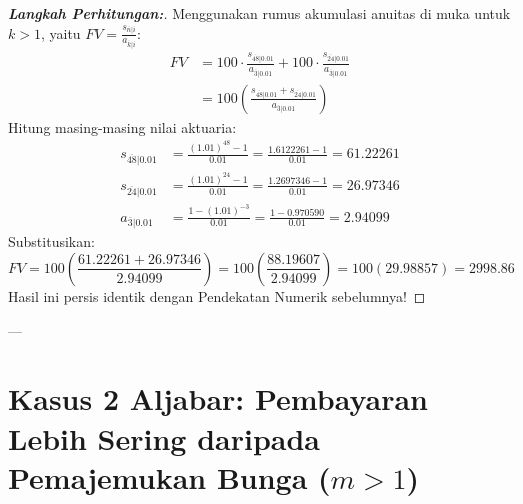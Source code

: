 \documentclass[11pt,a4paper]{article}
\begin{document}
\begin{proof}[\textbf{Langkah Perhitungan:}]
Menggunakan rumus akumulasi anuitas di muka untuk $k > 1$, yaitu $FV = \frac{s_{\overline{n}|i}}{a_{\overline{k}|i}}$:
\begin{align*}
    FV &= 100 \cdot \frac{s_{\overline{48}|0.01}}{a_{\overline{3}|0.01}} + 100 \cdot \frac{s_{\overline{24}|0.01}}{a_{\overline{3}|0.01}} \\
       &= 100 \left( \frac{s_{\overline{48}|0.01} + s_{\overline{24}|0.01}}{a_{\overline{3}|0.01}} \right)
\end{align*}
Hitung masing-masing nilai aktuaria:
\begin{align*}
    s_{\overline{48}|0.01} &= \frac{(1.01)^{48} - 1}{0.01} = \frac{1.6122261 - 1}{0.01} = 61.22261 \\
    s_{\overline{24}|0.01} &= \frac{(1.01)^{24} - 1}{0.01} = \frac{1.2697346 - 1}{0.01} = 26.97346 \\
    a_{\overline{3}|0.01}  &= \frac{1 - (1.01)^{-3}}{0.01} = \frac{1 - 0.970590}{0.01} = 2.94099
\end{align*}
Substitusikan:
\begin{equation*}
    FV = 100 \left( \frac{61.22261 + 26.97346}{2.94099} \right) = 100 \left( \frac{88.19607}{2.94099} \right) = 100 (29.98857) = \mathbf{2998.86}
\end{equation*}
Hasil ini persis identik dengan Pendekatan Numerik sebelumnya!
\end{proof}

---

\section{Kasus 2 Aljabar: Pembayaran Lebih Sering daripada Pemajemukan Bunga (\texorpdfstring{$m > 1$}{m > 1})}
\end{document}
